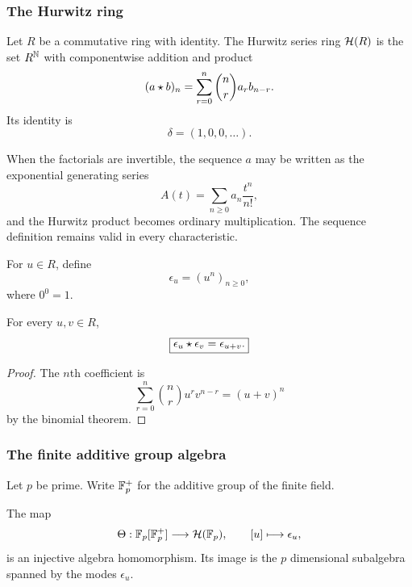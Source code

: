 \subsubsection{The Hurwitz ring}

\begin{histdefinition}\label{hist:def:hurwitz_ring}
Let \(R\) be a commutative ring with identity. The Hurwitz series ring \(\mathcal H(R)\) is the set \(R^{\mathbb N}\) with componentwise addition and product
\[
(a\mathbin{\star} b)_n
=
\sum_{r=0}^{n}
\binom nr a_r b_{n-r}.
\]
Its identity is
\[
\delta=(1,0,0,\ldots).
\]
\end{histdefinition}

When the factorials are invertible, the sequence \(a\) may be written as the exponential generating series
\[
A(t)=\sum_{n\geq0}a_n\frac{t^n}{n!},
\]
and the Hurwitz product becomes ordinary multiplication. The sequence definition remains valid in every characteristic.

\begin{histdefinition}\label{hist:def:exponential_mode}
For \(u\in R\), define
\[
\epsilon_u=(u^n)_{n\geq0},
\]
where \(0^0=1\).
\end{histdefinition}

\begin{histproposition}\label{hist:prop:mode_addition}
For every \(u,v\in R\),
\[
\boxed{
\epsilon_u\mathbin{\star}\epsilon_v
=
\epsilon_{u+v}.
}
\]
\end{histproposition}

\begin{proof}
The \(n\)th coefficient is
\[
\sum_{r=0}^{n}
\binom nr u^rv^{n-r}
=
(u+v)^n
\]
by the binomial theorem.
\end{proof}

\subsubsection{The finite additive group algebra}

Let \(p\) be prime. Write \(\mathbb F_p^+\) for the additive group of the finite field.

\begin{histtheorem}\label{hist:thm:mode_group_algebra}
The map
\[
\Theta:
\mathbb F_p[\mathbb F_p^+]
\longrightarrow
\mathcal H(\mathbb F_p),
\qquad
[u]\longmapsto\epsilon_u,
\]
is an injective algebra homomorphism. Its image is the \(p\) dimensional subalgebra spanned by the modes \(\epsilon_u\).
\end{histtheorem}

